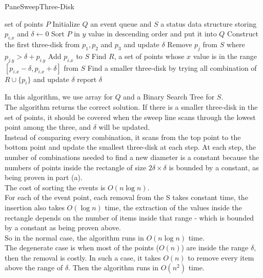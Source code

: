 \begin{algorithm}[h]
  \caption{PaneSweepThree-Disk}
  \label{alg:panesweep}
  \begin{algorithmic}
      \Require set of points $P$
      \State Initialize $Q$ an event queue and $S$ a status data structure storing $p_{i.x}$ and $\delta \leftarrow 0$
      \State Sort $P$ in $y$ value in descending order and put it into $Q$
      \State Construct the first three-disk from $p_1, p_2$ and $p_3$ and update $\delta$
	\State Remove $p_j$ from $S$ where  $ p_{j.y} > \delta + p_{i.y} $
	\State Add $p_{i.x}$ to $S$
	\State Find $R$, a set of points whose $x$ value is in the range  $[ p_{i.x} - \delta,  p_{i.x} + \delta ]$ from $S$
	\State Find a smaller three-disk by trying all combination of $R \cup \{p_i\}$ and update $\delta$
	\EndIf
      \EndFor
      \State report $\delta$
\end{algorithmic}
\end{algorithm}

In this algorithm, we use array for $Q$ and a Binary Search Tree for $S$.  \\

The algorithm returns the correct solution. If there is a smaller three-disk in the set of points, it should be covered when the 
sweep line scans through the lowest point among the three, and $\delta$ will be updated.\\

Instead of comparing every combination, it scans from the top point to the bottom point and update the smallest three-disk at each step. At each step, the number of combinations needed to find a new diameter is a constant because the numbers of points inside the rectangle of size $2 \delta \times \delta$ is bounded by a constant, as being proven in part (a). \\

The cost of sorting the events is $O(n\log n)$. \\

For each of the event point, each removal from the S takes constant time, the insertion also takes $O(\log n)$ time, the extraction of the values inside the rectangle depends on the number of items inside that range - which is bounded by a constant as being proven above. \\

So in the normal case, the algorithm runs in $O(n \log n)$ time. \\

The degenerate case is when most of the points ($O(n)$) are inside the range $\delta$, then the removal is costly. In such a case, it takes $O(n)$ to remove every item above the range of $\delta$. Then the algorithm runs in $O(n^2)$ time.\\
